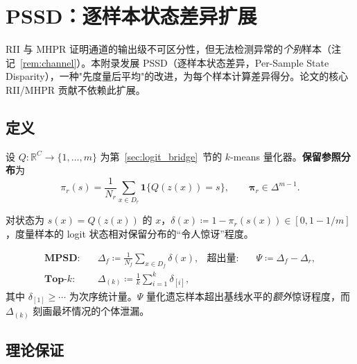 
\appendix

\section{PSSD：逐样本状态差异扩展}
\label{app:pssd}

RII 与 MHPR 证明通道的输出级不可区分性，但无法检测异常的\emph{个别}样本（注记~\ref{rem:channel}）。本附录发展 PSSD（逐样本状态差异，Per-Sample State Disparity），一种"先度量后平均"的改进，为每个样本计算差异得分。论文的核心 RII/MHPR 贡献不依赖此扩展。

\subsection{定义}

设 $Q:\mathbb{R}^C\to\{1,\dots,m\}$ 为第~\ref{sec:logit_bridge}~节的 $k$-means 量化器。\textbf{保留参照分布}为
\begin{equation}
\pi_r(s) = \frac{1}{N_r}\sum_{x\in D_r}\mathbf{1}\{Q(z(x))=s\}, \qquad \boldsymbol{\pi}_r\in\Delta^{m-1}.
\end{equation}

\begin{definition}
\label{def:isd}
对状态为 $s(x)=Q(z(x))$ 的 $x$，$\delta(x)\coloneqq 1-\pi_r(s(x))\in[0,1-1/m]$，度量样本的 logit 状态相对保留分布的``令人惊讶''程度。
\end{definition}

\begin{definition}[聚合 PSSD 指标]
\label{def:pssd_agg}
\begin{align}
\textbf{MPSD:}\quad &\Delta_f \coloneqq \frac{1}{N_f}\sum_{x\in D_f}\delta(x), &
\textbf{超出量:}\quad &\Psi \coloneqq \Delta_f - \Delta_r,\\
\textbf{Top-$k$:}\quad &\Delta_{(k)} \coloneqq \frac{1}{k}\sum_{i=1}^k\delta_{[i]},
\end{align}
其中 $\delta_{[1]}\ge\cdots$ 为次序统计量。$\Psi$ 量化遗忘样本超出基线水平的\emph{额外}惊讶程度，而 $\Delta_{(k)}$ 刻画最坏情况的个体泄漏。
\end{definition}

\subsection{理论保证}

